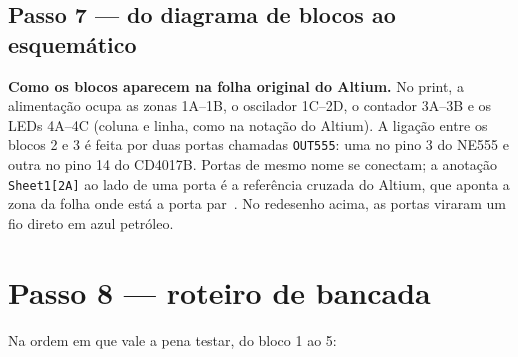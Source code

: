 \documentclass[11pt,a4paper]{article}
\begin{document}
\begin{landscape}
\section{Passo 7 — do diagrama de blocos ao esquemático}
\begin{center}
\esquematico[blocos]
\end{center}
\small
\textbf{Como os blocos aparecem na folha original do Altium.} No print, a alimentação
ocupa as zonas 1A–1B, o oscilador 1C–2D, o contador 3A–3B e os LEDs 4A–4C (coluna e linha,
como na notação do Altium). A
ligação entre os blocos 2 e 3 é
feita por duas portas chamadas \texttt{OUT555}: uma no pino 3 do NE555 e outra no pino
14 do CD4017B. Portas de mesmo nome se conectam; a anotação \texttt{Sheet1[2A]} ao lado de
uma porta é a referência cruzada do Altium, que aponta a zona da folha onde está a porta
par~\cite{altium}. No redesenho acima, as portas viraram um fio direto em azul petróleo.
\end{landscape}

\section{Passo 8 — roteiro de bancada}
Na ordem em que vale a pena testar, do bloco 1 ao 5:
\end{document}
